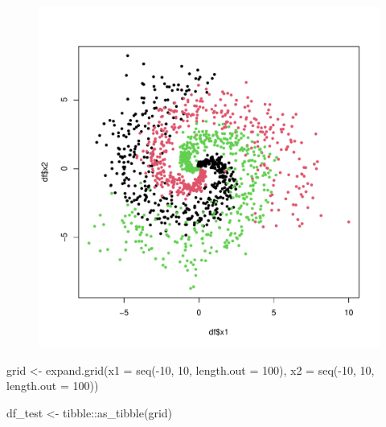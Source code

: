 \documentclass[
  letterpaper,
  DIV=11,
  numbers=noendperiod]{scrartcl}
\newenvironment{Shaded}{\begin{snugshade}}{\end{snugshade}}
\newcommand{\AttributeTok}[1]{\textcolor[rgb]{0.40,0.45,0.13}{#1}}
\newcommand{\DecValTok}[1]{\textcolor[rgb]{0.68,0.00,0.00}{#1}}
\newcommand{\FunctionTok}[1]{\textcolor[rgb]{0.28,0.35,0.67}{#1}}
\newcommand{\NormalTok}[1]{\textcolor[rgb]{0.00,0.23,0.31}{#1}}
\newcommand{\OtherTok}[1]{\textcolor[rgb]{0.00,0.23,0.31}{#1}}
\newcommand{\SpecialCharTok}[1]{\textcolor[rgb]{0.37,0.37,0.37}{#1}}
\begin{document}
\begin{Shaded}
\end{Shaded}

\begin{figure}[H]

{\centering \includegraphics{hw5_files/figure-pdf/unnamed-chunk-27-1.pdf}

}

\end{figure}

\begin{Shaded}
\begin{Highlighting}[]
\NormalTok{grid }\OtherTok{\textless{}{-}} \FunctionTok{expand.grid}\NormalTok{(}\AttributeTok{x1 =} \FunctionTok{seq}\NormalTok{(}\SpecialCharTok{{-}}\DecValTok{10}\NormalTok{, }\DecValTok{10}\NormalTok{, }\AttributeTok{length.out =} \DecValTok{100}\NormalTok{), }
                    \AttributeTok{x2 =} \FunctionTok{seq}\NormalTok{(}\SpecialCharTok{{-}}\DecValTok{10}\NormalTok{, }\DecValTok{10}\NormalTok{, }\AttributeTok{length.out =} \DecValTok{100}\NormalTok{))}

\NormalTok{df\_test }\OtherTok{\textless{}{-}}\NormalTok{ tibble}\SpecialCharTok{::}\FunctionTok{as\_tibble}\NormalTok{(grid)}
\end{Highlighting}
\end{Shaded}
\end{document}
